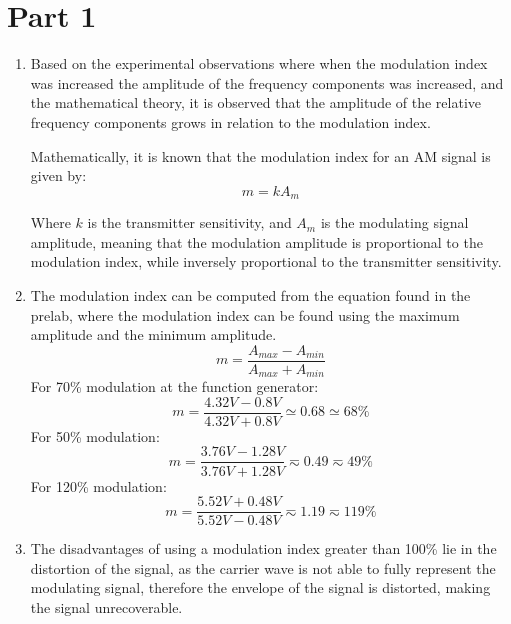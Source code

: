 \section{Part 1}
\begin{enumerate}
    \item Based on the experimental observations where when the modulation index was increased the amplitude of the frequency components was increased, and the mathematical theory, it is observed that the amplitude of the relative frequency components grows in relation to the modulation index.

          Mathematically, it is known that the modulation index for an AM signal is given by:
          \begin{equation}
              m = kA_m
          \end{equation}

          Where $k$ is the transmitter sensitivity, and $A_m$ is the modulating signal amplitude, meaning that the modulation amplitude is proportional to the modulation index, while inversely proportional to the transmitter sensitivity.
    \item The modulation index can be computed from the equation found in the prelab, where the modulation index can be found using the maximum amplitude and the minimum amplitude.
          \begin{equation}
              m = \frac{A_{max} - A_{min}}{A_{max} + A_{min}}
          \end{equation}
          For 70\% modulation at the function generator:
          \begin{equation}
              m = \frac{4.32V - 0.8V}{4.32V + 0.8V} \simeq 0.68 \simeq 68\%
          \end{equation}
          For 50\% modulation:
          \begin{equation}
              m = \frac{3.76V - 1.28V}{3.76V + 1.28V} \eqsim 0.49 \eqsim 49\%
          \end{equation}
          For 120\% modulation:
          \begin{equation}
              m = \frac{5.52V + 0.48V}{5.52V - 0.48V} \eqsim 1.19 \eqsim 119\%
          \end{equation}
    \item The disadvantages of using a modulation index greater than 100\% lie in the distortion of the signal, as the carrier wave is not able to fully represent the modulating signal, therefore the envelope of the signal is distorted, making the signal unrecoverable.
\end{enumerate}

